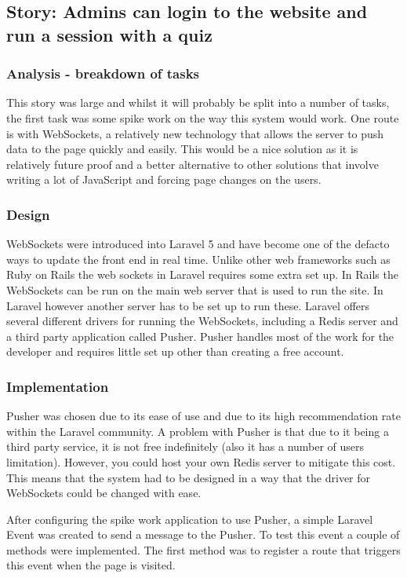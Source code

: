 \subsection{Story: Admins can login to the website and run a session with a quiz}
\subsubsection{Analysis - breakdown of tasks}
This story was large and whilst it will probably be split into a number of tasks, the first task was some spike work on the way this system would work. One route is with WebSockets, a relatively new technology that allows the server to push data to the page quickly and easily\cite{websockets}. This would be a nice solution as it is relatively future proof and a better alternative to other solutions that involve writing a lot of JavaScript and forcing page changes on the users.
\subsubsection{Design}
WebSockets were introduced into Laravel 5 and have become one of the defacto ways to update the front end in real time. Unlike other web frameworks such as Ruby on Rails the web sockets in Laravel requires some extra set up. In Rails the WebSockets can be run on the main web server that is used to run the site\cite{rails-websockets}. In Laravel however another server has to be set up to run these. Laravel offers several different drivers for running the WebSockets, including a Redis server and a third party application called Pusher\cite{laravel-broadcasting}. Pusher handles most of the work for the developer and requires little set up other than creating a free account\cite{pusher-what-is}.
\subsubsection{Implementation}
Pusher was chosen due to its ease of use and due to its high recommendation rate within the Laravel community. A problem with Pusher is that due to it being a third party service, it is not free indefinitely (also it has a number of users limitation). However, you could host your own Redis server to mitigate this cost. This means that the system had to be designed in a way that the driver for WebSockets could be changed with ease.

After configuring the spike work application to use Pusher, a simple Laravel Event was created to send a message to the Pusher. To test this event a couple of methods were implemented. The first method was to register a route that triggers this event when the page is visited.
 
